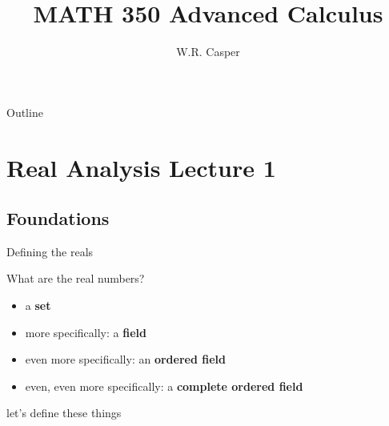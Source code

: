 \documentclass{beamer}
\title{MATH 350 Advanced Calculus}
\subtitle
{} %
\author[W.R. Casper] %
{W.R. Casper}
\institute[California State University Fullerton] %
{
  Department of Mathematics\\
  California State University Fullerton}
\begin{document}
\begin{frame}
  \titlepage
\end{frame}

\begin{frame}{Outline}
  \tableofcontents
\end{frame}



\section{Real Analysis Lecture 1}
\subsection{Foundations}

\begin{frame}{Defining the reals}
\pause
\begin{quest}
What are the real numbers?
\end{quest}
\begin{itemize}
\pause
\item a \textbf{set}
\pause
\item more specifically: a \textbf{field}
\pause
\item even more specifically: an \textbf{ordered field}
\pause
\item even, even more specifically: a \textbf{complete ordered field}
\end{itemize}
\pause
\begin{center}
{\color{blue}let's define these things}
\end{center}
\end{frame}
\end{document}

